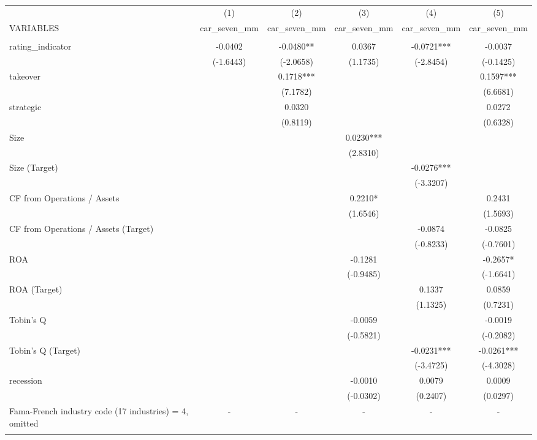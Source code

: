 \documentclass[12pt]{article}
\begin{document}
\begin{adjustbox}{max width=\textwidth}
   \begin{tabular}{lccccc} \hline
	& (1) & (2) & (3) & (4) & (5) \\
   VARIABLES & car\_seven\_mm & car\_seven\_mm & car\_seven\_mm & car\_seven\_mm & car\_seven\_mm \\ \hline
	&  &  &  &  &  \\
   rating\_indicator & -0.0402 & -0.0480** & 0.0367 & -0.0721*** & -0.0037 \\
	& (-1.6443) & (-2.0658) & (1.1735) & (-2.8454) & (-0.1425) \\
   takeover &  & 0.1718*** &  &  & 0.1597*** \\
	&  & (7.1782) &  &  & (6.6681) \\
   strategic &  & 0.0320 &  &  & 0.0272 \\
	&  & (0.8119) &  &  & (0.6328) \\
   Size &  &  & 0.0230*** &  &  \\
	&  &  & (2.8310) &  &  \\
   Size (Target) &  &  &  & -0.0276*** &  \\
	&  &  &  & (-3.3207) &  \\
   CF from Operations / Assets &  &  & 0.2210* &  & 0.2431 \\
	&  &  & (1.6546) &  & (1.5693) \\
   CF from Operations / Assets (Target) &  &  &  & -0.0874 & -0.0825 \\
	&  &  &  & (-0.8233) & (-0.7601) \\
   ROA &  &  & -0.1281 &  & -0.2657* \\
	&  &  & (-0.9485) &  & (-1.6641) \\
   ROA (Target) &  &  &  & 0.1337 & 0.0859 \\
	&  &  &  & (1.1325) & (0.7231) \\
   Tobin's Q &  &  & -0.0059 &  & -0.0019 \\
	&  &  & (-0.5821) &  & (-0.2082) \\
   Tobin's Q (Target) &  &  &  & -0.0231*** & -0.0261*** \\
	&  &  &  & (-3.4725) & (-4.3028) \\
   recession &  &  & -0.0010 & 0.0079 & 0.0009 \\
	&  &  & (-0.0302) & (0.2407) & (0.0297) \\
   Fama-French industry code (17 industries) = 4, omitted & - & - & - & - & - \\
	&  &  &  &  &  \\

\end{tabular}
\end{adjustbox}
\end{document}
